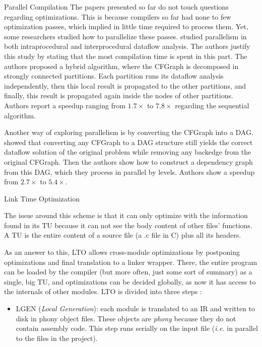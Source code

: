 \begin{section}{Parallel Compilation}
The papers presented so far do not touch questions regarding optimizations.
This is because compilers so far had none to few optimization passes, which
implied in little time required to process them. Yet, some researchers studied
how to parallelize these passes. \cite{Lee1994} studied parallelism in both
intraprocedural and interprocedural dataflow analysis. The authors justify this
study by stating that the most compilation time is spent in this part. The
authors proposed a hybrid algorithm, where the CFGraph is decomposed in
strongly connected partitions. Each partition runs its dataflow analysis
independently, then this local result is propagated to the other partitions,
and finally, this result is propagated again inside the nodes of other
partitions. Authors report a speedup ranging from $1.7\times$ to $7.8\times$
regarding the sequential algorithm.

Another way of exploring parallelism is by converting the CFGraph into a DAG.
\cite{kramer1994combining} showed that converting any CFGraph to a DAG
structure still yields the correct dataflow solution of the original problem
while removing any backedge from the original CFGraph. Then the authors show
how to construct a dependency graph from this DAG, which they process in
parallel by levels. Authors show a speedup from $2.7\times$ to $5.4\times$.


\begin{subsection}{Link Time Optimization}

The issue around this scheme is that it can only optimize with
the information found in its TU because it can not see the body
content of other files' functions. A TU is the
entire content of a source file (a .c file in C) plus all its headers.

As an answer to this, LTO allows cross-module optimizations by
postponing optimizations and final translation to a linker wrapper. There, the entire
program can be loaded by the compiler (but more often, just some sort of summary)
as a single, big TU, and optimizations can be decided globally,
as now it has access to the internals of other modules. LTO is divided into
three steps \citep{whoprgoogle,glek2010optimizing}:
\begin{itemize}
\item LGEN (\textit{Local Generation}): each module is translated to an IR and
written to disk in phony object files. These objects are \emph{phony} because
they do not contain assembly code. This step runs serially on the input file
(\textit{i.e.} in parallel to the files in the project).


\end{itemize}
\end{subsection}
\end{section}
